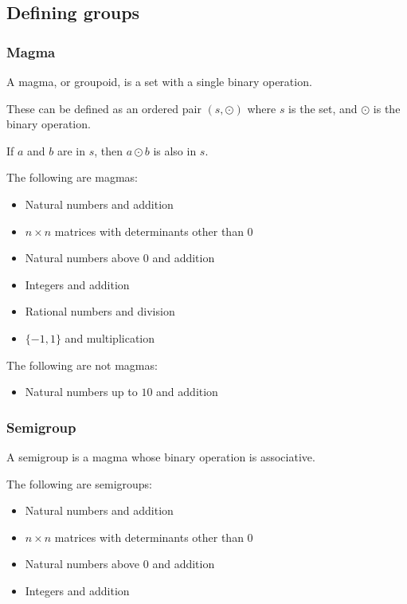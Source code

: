 
\subsection{Defining groups}

\subsubsection{Magma}

A magma, or groupoid, is a set with a single binary operation.

These can be defined as an ordered pair \((s,\odot )\) where \(s\) is the set, and \(\odot \) is the binary operation.

If \(a\) and \(b\) are in \(s\), then \(a\odot b\) is also in \(s\).

The following are magmas:

\begin{itemize}
\item Natural numbers and addition
\item \(n\times n\) matrices with determinants other than \(0\)
\item Natural numbers above \(0\) and addition
\item Integers and addition
\item Rational numbers and division
\item \(\{-1, 1\}\) and multiplication
\end{itemize}

The following are not magmas:

\begin{itemize}
\item Natural numbers up to \(10\) and addition
\end{itemize}

\subsubsection{Semigroup}

A semigroup is a magma whose binary operation is associative.

The following are semigroups:

\begin{itemize}
\item Natural numbers and addition
\item \(n\times n\) matrices with determinants other than \(0\)
\item Natural numbers above \(0\) and addition
\item Integers and addition
\end{itemize}

